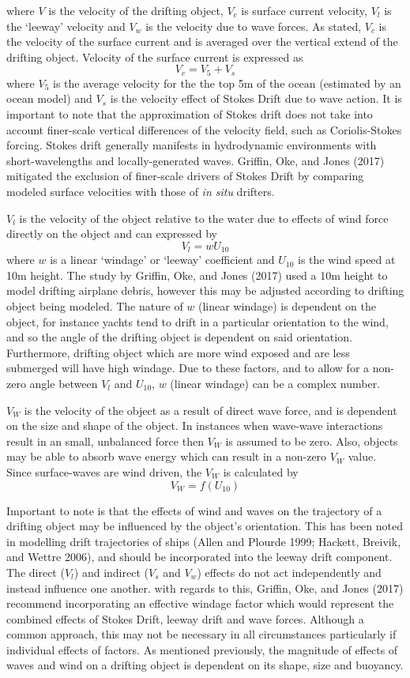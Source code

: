 \documentclass[
]{article}
\begin{document}
where \(V\) is the velocity of the drifting object, \(V_c\) is surface
current velocity, \(V_l\) is the `leeway' velocity and \(V_w\) is the
velocity due to wave forces. As stated, \(V_c\) is the velocity of the
surface current and is averaged over the vertical extend of the drifting
object. Velocity of the surface current is expressed as
\[V_c = V_5 + V_s\] where \(V_5\) is the average velocity for the the
top 5m of the ocean (estimated by an ocean model) and \(V_s\) is the
velocity effect of Stokes Drift due to wave action. It is important to
note that the approximation of Stokes drift does not take into account
finer-scale vertical differences of the velocity field, such as
Coriolis-Stokes forcing. Stokes drift generally manifests in
hydrodynamic environments with short-wavelengths and locally-generated
waves. Griffin, Oke, and Jones (2017) mitigated the exclusion of
finer-scale drivers of Stokes Drift by comparing modeled surface
velocities with those of \emph{in situ} drifters.

\(V_l\) is the velocity of the object relative to the water due to
effects of wind force directly on the object and can expressed by
\[V_l = w U_10\] where \(w\) is a linear `windage' or `leeway'
coefficient and \(U_10\) is the wind speed at 10m height. The study by
Griffin, Oke, and Jones (2017) used a 10m height to model drifting
airplane debris, however this may be adjusted according to drifting
object being modeled. The nature of \(w\) (linear windage) is dependent
on the object, for instance yachts tend to drift in a particular
orientation to the wind, and so the angle of the drifting object is
dependent on said orientation. Furthermore, drifting object which are
more wind exposed and are less submerged will have high windage. Due to
these factors, and to allow for a non-zero angle between \(V_l\) and
\(U_10\), \(w\) (linear windage) can be a complex number.

\(V_W\) is the velocity of the object as a result of direct wave force,
and is dependent on the size and shape of the object. In instances when
wave-wave interactions result in an small, unbalanced force then \(V_W\)
is assumed to be zero. Also, objects may be able to absorb wave energy
which can result in a non-zero \(V_W\) value. Since surface-waves are
wind driven, the \(V_W\) is calculated by \[V_W = f(U_10)\]

Important to note is that the effects of wind and waves on the
trajectory of a drifting object may be influenced by the object's
orientation. This has been noted in modelling drift trajectories of
ships (Allen and Plourde 1999; Hackett, Breivik, and Wettre 2006), and
should be incorporated into the leeway drift component. The direct
(\(V_l\)) and indirect (\(V_s\) and \(V_w\)) effects do not act
independently and instead influence one another. with regards to this,
Griffin, Oke, and Jones (2017) recommend incorporating an effective
windage factor which would represent the combined effects of Stokes
Drift, leeway drift and wave forces. Although a common approach, this
may not be necessary in all circumstances particularly if individual
effects of factors. As mentioned previously, the magnitude of effects of
waves and wind on a drifting object is dependent on its shape, size and
buoyancy.
\end{document}
